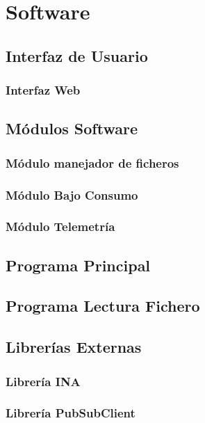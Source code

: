 \section{Software}

\subsection{Interfaz de Usuario}
\subsubsection{Interfaz Web}


\subsection{Módulos Software}
\subsubsection{Módulo manejador de ficheros}\label{subsubsec:ManejadorFicheros}








\subsubsection{Módulo Bajo Consumo}


\subsubsection{Módulo Telemetría}


\subsection{Programa Principal}


\subsection{Programa Lectura Fichero}


\subsection{Librerías Externas}
\subsubsection{Librería INA}


\subsubsection{Librería PubSubClient}



